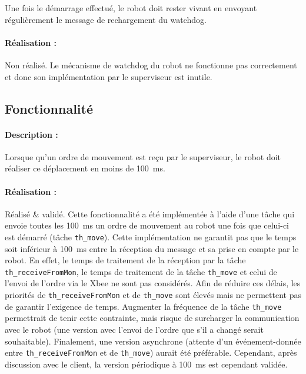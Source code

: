 \documentclass[11pt, a4paper]{paper}
\newcounter{cptreq}
\begin{document}
Une fois le démarrage effectué, le robot doit rester vivant en envoyant régulièrement le message de rechargement du watchdog.

\paragraph{\color{black}Réalisation :}  {\color{black} Non réalisé. Le mécanisme de watchdog du robot ne fonctionne pas correctement et donc son implémentation par le superviseur est inutile.}

\subsection{Fonctionnalité \thecptreq}

\paragraph{Description :} Lorsque qu'un ordre de mouvement est reçu par le superviseur, le robot doit réaliser ce déplacement en moins de 100~ms.

\paragraph{\color{black}Réalisation :} {\color{black} Réalisé \& validé. Cette fonctionnalité a été implémentée à l'aide d'une tâche qui envoie toutes les 100~ms un ordre de mouvement au robot une fois que celui-ci est démarré (tâche {\tt th\_move}). Cette implémentation ne garantit pas que le temps soit inférieur à 100~ms entre la réception du message et sa prise en compte par le robot. En effet, le temps de traitement de la réception par la tâche {\tt th\_receiveFromMon}, le temps de traitement de la tâche {\tt th\_move} et celui de l'envoi de l'ordre via le Xbee ne sont pas considérés. Afin de réduire ces délais, les priorités de  {\tt th\_receiveFromMon} et de {\tt th\_move} sont élevés mais ne permettent pas de garantir l'exigence de temps. Augmenter la fréquence de la tâche {\tt th\_move} permettrait de tenir cette contrainte, mais risque de surcharger la communication avec le robot (une version avec l'envoi de l'ordre que s'il a changé serait souhaitable). Finalement, une version asynchrone (attente d'un événement-donnée entre {\tt th\_receiveFromMon} et de {\tt th\_move}) aurait été préférable. Cependant, après discussion avec le client, la version périodique à 100~ms est cependant validée. }

\end{document}
